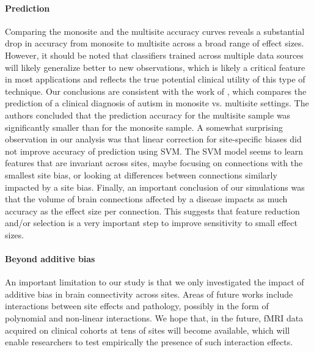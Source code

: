 \documentclass[authoryear]{elsarticle}
\begin{document}
\paragraph{Prediction}
Comparing the monosite and the multisite accuracy curves reveals a substantial
drop in accuracy from monosite to multisite across a broad range of effect
sizes. However, it should be noted that classifiers trained across multiple data
sources will likely generalize better to new observations, which is likely a
critical feature in most applications and reflects the true potential clinical
utility of this type of technique. Our conclusions are consistent with the work of
\cite{Nielsen2013}, which compares the prediction of a clinical diagnosis of
autism in monosite vs. multisite settings. The authors concluded that the
prediction accuracy for the multisite sample was significantly smaller than for
the monosite sample. A somewhat surprising observation in our analysis was that linear
correction for site-specific biases did not improve accuracy of prediction using
SVM. The SVM model seems to learn features that are invariant across sites,
maybe focusing on connections with the smallest site bias, or looking at
differences between connections similarly impacted by a site bias. Finally, an
important conclusion of our simulations was that the volume of brain connections
affected by a disease impacts as much accuracy as the effect size per
connection. This suggests that feature reduction and/or selection is a very
important step to improve sensitivity to small effect sizes.

\paragraph{Beyond additive bias} An important limitation to our study is that we only investigated the impact of additive bias in brain connectivity across sites. Areas of future works include interactions between site effects and pathology, possibly in the form of polynomial and non-linear interactions. We hope that, in the future, fMRI data acquired on clinical cohorts at tens of sites will become available, which will enable researchers to test empirically the presence of such interaction effects. 
\end{document}
